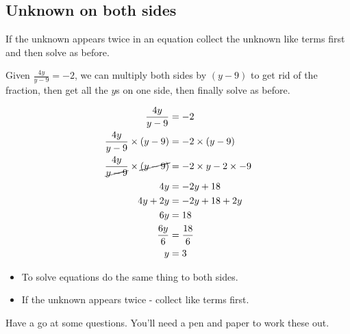 \documentclass[
  a4paper,
]{scrbook}
\providecommand{\tightlist}{%
  \setlength{\itemsep}{0pt}\setlength{\parskip}{0pt}}\usepackage{longtable,booktabs,array}
\begin{document}
\hypertarget{unknown-on-both-sides}{%
\subsection{Unknown on both sides}\label{unknown-on-both-sides}}

If the unknown appears twice in an equation collect the unknown like
terms first and then solve as before.

Given \(\frac{4y}{y-9}=-2\), we can multiply both sides by \((y-9)\) to
get rid of the fraction, then get all the \(y\)s on one side, then
finally solve as before.

\[
\begin{aligned} \frac{4y}{y-9} &= -2 \\
\frac{4y}{y-9} \times (y-9) &= -2 \times (y-9) \\
\frac{4y}{\cancel{y-9}} \times \cancel{(y-9)} &= -2 \times y -2 \times -9 \\
4y &= -2y + 18 \\
4y + 2y &= -2y + 18 +2y\\
6y &= 18\\
\frac{6y}{6} &= \frac{18}{6}\\
y &= 3
\end{aligned}
\]

\begin{tcolorbox}[enhanced jigsaw, opacityback=0, left=2mm, toptitle=1mm, title=\textcolor{quarto-callout-note-color}{\faInfo}\hspace{0.5em}{Note}, breakable, colbacktitle=quarto-callout-note-color!10!white, opacitybacktitle=0.6, bottomtitle=1mm, arc=.35mm, colback=white, leftrule=.75mm, bottomrule=.15mm, colframe=quarto-callout-note-color-frame, rightrule=.15mm, titlerule=0mm, toprule=.15mm, coltitle=black]

\begin{itemize}
\tightlist
\item
  To solve equations do the same thing to both sides.
\item
  If the unknown appears twice - collect like terms first.
\end{itemize}

\end{tcolorbox}

Have a go at some questions. You'll need a pen and paper to work these
out.
\end{document}
